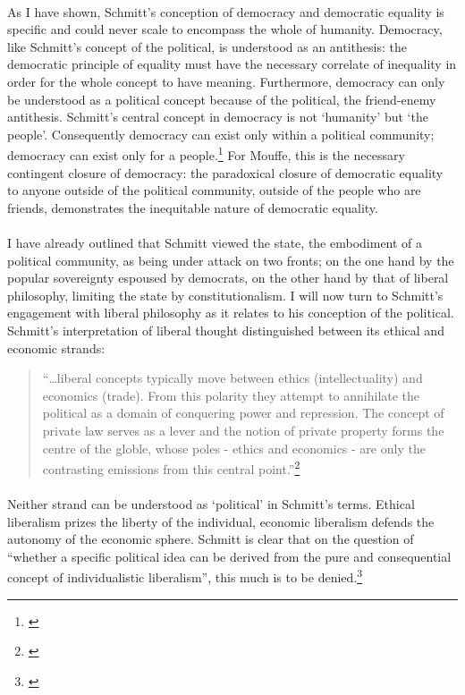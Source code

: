 \documentclass[12pt,a4paper,titlepage]{article}
\begin{document}
\paragraph{}As I have shown, Schmitt's conception of democracy and democratic equality is specific and could never scale to encompass the whole of humanity. Democracy, like Schmitt's concept of the political, is understood as an antithesis: the democratic principle of equality must have the necessary correlate of inequality in order for the whole concept to have meaning. Furthermore, democracy can only be understood as a political concept because of the political, the friend-enemy antithesis. Schmitt's central concept in democracy is not `humanity' but `the people'. Consequently democracy can exist only within a political community; democracy can exist only for a people.\footnote{\cite[p.41]{Mouffe:2000fk}}  For Mouffe, this is the necessary contingent closure of democracy: the paradoxical closure of democratic equality to anyone outside of the political community, outside of the people who are friends, demonstrates the inequitable nature of democratic equality.

\paragraph{}I have already outlined that Schmitt viewed the state, the embodiment of a political community, as being under attack on two fronts; on the one hand by the popular sovereignty espoused by democrats, on the other hand by that of liberal philosophy, limiting the state by constitutionalism. I will now turn to Schmitt's engagement with liberal philosophy as it relates to his conception of the political. Schmitt's interpretation of liberal thought distinguished between its ethical and economic strands:
\begin{quote}
``\ldots liberal concepts typically move between ethics (intellectuality) and economics (trade). From this polarity they attempt to annihilate the political as a domain of conquering power and repression. The concept of private law serves as a lever and the notion of private property forms the centre of the globle, whose poles - ethics and economics - are only the contrasting emissions from this central point.''\footnote{\cite[p.71]{schmitt:1966cop}}
\end{quote}

\paragraph{}Neither strand can be understood as `political' in Schmitt's terms. Ethical liberalism prizes the liberty of the individual, economic liberalism defends the autonomy of the economic sphere. Schmitt is clear that on the question of ``whether a specific political idea can be derived from the pure and consequential concept of individualistic liberalism'', this much is to be denied.\footnote{\cite[p.71]{schmitt:2007cop}}
\end{document}
